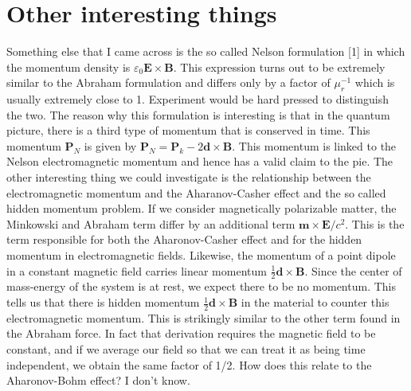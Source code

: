 \documentclass[twocolumn,english,pra,aps,superscriptaddress,floatfix]{revtex4-1}
\begin{document}
\section{Other interesting things}
\label{sec:interesting}

Something else that I came across is the so called Nelson formulation [1] in which the momentum density is $\varepsilon_0\mathbf{E}\times\mathbf{B}$.  This expression turns out to be extremely similar to the Abraham formulation and differs only by a factor of $\mu^{-1}_r$ which is usually extremely close to 1.  Experiment would be hard pressed to distinguish the two.  The reason why this formulation is interesting is that in the quantum picture, there is a third type of momentum that is conserved in time.  This momentum $\mathbf{P}_N$ is given by $\mathbf{P}_N=\mathbf{P}_k - 2\mathbf{d}\times\mathbf{B}$.  This momentum is linked to the Nelson electromagnetic momentum and hence has a valid claim to the pie.
The other interesting thing we could investigate is the relationship between the electromagnetic momentum and the Aharanov-Casher effect and the so called hidden momentum problem.  If we consider magnetically polarizable matter, the Minkowski and Abraham term differ by an additional term $\mathbf{m}\times\mathbf{E}/c^2$.  This is the term responsible for both the Aharonov-Casher effect and for the hidden momentum in electromagnetic fields.  Likewise, the momentum of a point dipole in a constant magnetic field carries linear momentum $\frac{1}{2}\mathbf{d}\times\mathbf{B}$.  Since the center of mass-energy of the system is at rest, we expect there to be no momentum.  This tells us that there is hidden momentum $\frac{1}{2}\mathbf{d}\times\mathbf{B}$ in the material to counter this electromagnetic momentum.  This is strikingly similar to the other term found in the Abraham force.  In fact that derivation requires the magnetic field to be constant, and if we average our field so that we can treat it as being time independent, we obtain the same factor of 1/2.  How does this relate to the Aharonov-Bohm effect? I don't know.
\end{document}
